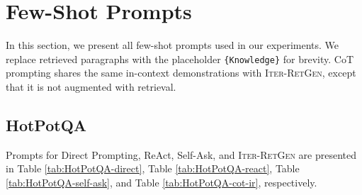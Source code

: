 \section{Few-Shot Prompts}
In this section, we present all few-shot prompts used in our experiments. We replace retrieved paragraphs with the placeholder \texttt{\{Knowledge\}} for brevity. CoT prompting shares the same in-context demonstrations with I\textsc{ter}-R\textsc{et}G\textsc{en}, except that it is not augmented with retrieval.
\subsection{HotPotQA}
Prompts for Direct Prompting, ReAct, Self-Ask, and I\textsc{ter}-R\textsc{et}G\textsc{en} are presented in Table \ref{tab:HotPotQA-direct}, Table \ref{tab:HotPotQA-react}, Table \ref{tab:HotPotQA-self-ask}, and Table \ref{tab:HotPotQA-cot-ir}, respectively.
\begingroup
\setlength{\tabcolsep}{3pt}
\renewcommand{\arraystretch}{1}
\begin{table}[t!]
\small
\centering
{}
\caption{3-Shot Demonstrations for Direct Prompting on HotPotQA.}\label{tab:HotPotQA-direct}
\end{table}
\endgroup

